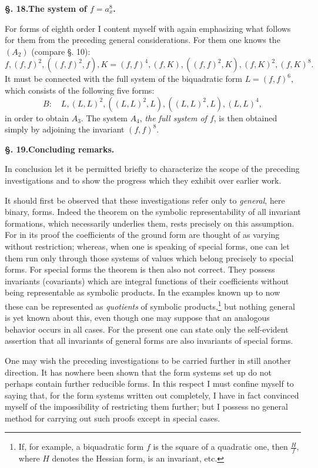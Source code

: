 \documentclass[10pt]{article}
\begin{document}
\begin{center}
{\bfseries §. 18.\quad The system of $f=a_x^8$.}
\end{center}

For forms of eighth order I content myself with again emphasizing what follows for them from the preceding general considerations. For them one knows the $(A_2)$ (compare §. 10):
\[
f,(f,f)^2,((f,f)^2,f),K=(f,f)^4,(f,K),((f,f)^2,K),(f,K)^2,(f,K)^8.
\]
It must be connected with the full system of the biquadratic form $L=(f,f)^6$, which consists of the following five forms:
\[
B:
\quad L,(L,L)^2,((L,L)^2,L),((L,L)^2,L),(L,L)^4,
\]
in order to obtain $A_3$. The system $A_4$, \textit{the full system of $f$}, is then obtained simply by adjoining the invariant $(f,f)^8$.

\begin{center}
{\bfseries §. 19.\quad Concluding remarks.}
\end{center}

In conclusion let it be permitted briefly to characterize the scope of the preceding investigations and to show the progress which they exhibit over earlier work.

It should first be observed that these investigations refer only to \textit{general}, here binary, forms. Indeed the theorem on the symbolic representability of all invariant formations, which necessarily underlies them, rests precisely on this assumption. For in its proof the coefficients of the ground form are thought of as varying without restriction; whereas, when one is speaking of special forms, one can let them run only through those systems of values which belong precisely to special forms. For special forms the theorem is then also not correct. They possess invariants (covariants) which are integral functions of their coefficients without being representable as symbolic products. In the examples known up to now these can be represented as \textit{quotients} of symbolic products,\footnote{If, for example, a biquadratic form $f$ is the square of a quadratic one, then $\frac{H}{f}$, where $H$ denotes the Hessian form, is an invariant, etc.} but nothing general is yet known about this, even though one may suppose that an analogous behavior occurs in all cases. For the present one can state only the self-evident assertion that all invariants of general forms are also invariants of special forms.

One may wish the preceding investigations to be carried further in still another direction. It has nowhere been shown that the form systems set up do not perhaps contain further reducible forms. In this respect I must confine myself to saying that, for the form systems written out completely, I have in fact convinced myself of the impossibility of restricting them further; but I possess no general method for carrying out such proofs except in special cases.
\end{document}
